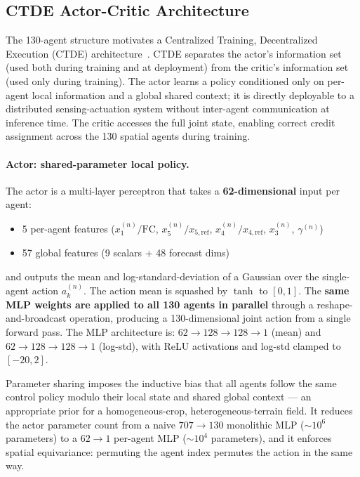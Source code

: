 \subsection{CTDE Actor-Critic Architecture}
\label{ssec:ctrl-sac-ctde}

The 130-agent structure motivates a Centralized Training, Decentralized
Execution (CTDE) architecture~\cite{amato2024ctde}. CTDE separates the
actor's information set (used both during training and at deployment) from
the critic's information set (used only during training). The actor learns
a policy conditioned only on per-agent local information and a global shared
context; it is directly deployable to a distributed sensing-actuation system
without inter-agent communication at inference time. The critic accesses the
full joint state, enabling correct credit assignment across the 130 spatial
agents during training.

\paragraph{Actor: shared-parameter local policy.}
The actor is a multi-layer perceptron that takes a \textbf{62-dimensional}
input per agent:
\begin{itemize}
  \item 5 per-agent features ($x_1^{(n)}/\mathrm{FC}$, $x_5^{(n)}/x_{5,\mathrm{ref}}$,
    $x_4^{(n)}/x_{4,\mathrm{ref}}$, $x_3^{(n)}$, $\gamma^{(n)}$)
  \item 57 global features (9 scalars + 48 forecast dims)
\end{itemize}
and outputs the mean and log-standard-deviation of a Gaussian over the single-agent
action $a^{(n)}_k$. The action mean is squashed by $\tanh$ to $[0, 1]$.
The \textbf{same MLP weights are applied to all 130 agents in parallel}
through a reshape-and-broadcast operation, producing a 130-dimensional joint
action from a single forward pass. The MLP architecture is:
$62 \to 128 \to 128 \to 1$ (mean) and $62 \to 128 \to 128 \to 1$ (log-std),
with ReLU activations and log-std clamped to $[-20, 2]$.

Parameter sharing imposes the inductive bias that all agents follow the same
control policy modulo their local state and shared global context --- an
appropriate prior for a homogeneous-crop, heterogeneous-terrain field.
It reduces the actor parameter count from a naive $707 \to 130$ monolithic
MLP ($\sim$$10^6$ parameters) to a $62 \to 1$ per-agent MLP ($\sim$$10^4$
parameters), and it enforces spatial equivariance: permuting the agent index
permutes the action in the same way.

